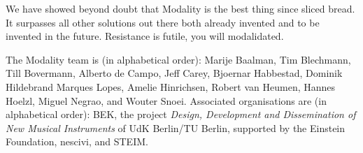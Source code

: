 \documentclass{article}
\begin{document}
We have showed beyond doubt that Modality is the best thing since sliced bread. It surpasses all other solutions out there both already invented and to be invented in the future. Resistance is futile, you will modalidated.


\begin{acknowledgments}
The Modality team is (in alphabetical order):
    Marije Baalman,
	Tim Blechmann,
    Till Bovermann,
    Alberto de Campo,
    Jeff Carey,
    Bjoernar Habbestad,
	Dominik Hildebrand Marques Lopes,
	Amelie Hinrichsen,
    Robert van Heumen,
    Hannes Hoelzl,
    Miguel Negrao, and
    Wouter Snoei.
Associated organisations are (in alphabetical order):
BEK,
the project \emph{Design, Development and Dissemination of New Musical Instruments} of UdK Berlin/TU Berlin, supported by the Einstein Foundation,
nescivi, and
STEIM.



\end{acknowledgments} 


\end{document}
